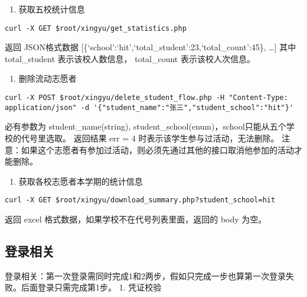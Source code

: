 \documentclass[]{article}
\providecommand{\tightlist}{%
  \setlength{\itemsep}{0pt}\setlength{\parskip}{0pt}}
\begin{document}
\begin{enumerate}
\def\labelenumi{\arabic{enumi}.}
\setcounter{enumi}{11}
\tightlist
\item
  获取五校统计信息
\end{enumerate}

\begin{verbatim}
curl -X GET $root/xingyu/get_statistics.php
\end{verbatim}

返回 JSON格式数据
{[}\{`school':`hit',`total\_student':23,`total\_count':45\}, \ldots{}{]}
其中 total\_student 表示该校人数信息， total\_count 表示该校人次信息。

\begin{enumerate}
\def\labelenumi{\arabic{enumi}.}
\setcounter{enumi}{12}
\tightlist
\item
  删除流动志愿者
\end{enumerate}

\begin{verbatim}
curl -X POST $root/xingyu/delete_student_flow.php -H "Content-Type: application/json" -d '{"student_name":"张三","student_school":"hit"}'
\end{verbatim}

必有参数为 student\_name(string),
student\_school(enum)，school只能从五个学校的代号里选取。 返回结果 err =
4 时表示该学生参与过活动，无法删除。
注意：如果这个志愿者有参加过活动，则必须先通过其他的接口取消他参加的活动才能删除。

\begin{enumerate}
\def\labelenumi{\arabic{enumi}.}
\setcounter{enumi}{13}
\tightlist
\item
  获取各校志愿者本学期的统计信息
\end{enumerate}

\begin{verbatim}
curl -X GET $root/xingyu/download_summary.php?student_school=hit
\end{verbatim}

返回 excel 格式数据，如果学校不在代号列表里面，返回的 body 为空。

\hypertarget{ux767bux5f55ux76f8ux5173}{%
\subsection{登录相关}\label{ux767bux5f55ux76f8ux5173}}

登录相关：第一次登录需同时完成1和2两步，假如只完成一步也算第一次登录失败。后面登录只需完成第1步。
1. 凭证校验
\end{document}

